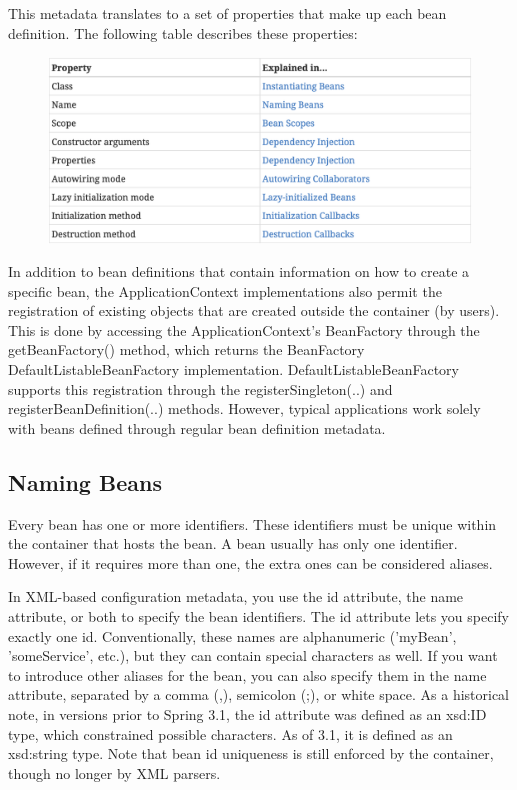 This metadata translates to a set of properties that make up each bean definition. The following
table describes these properties:


\begin{figure}[ht]
    \centering
    \includegraphics[width=1\linewidth]{./Figure/IMG_bean_def.png}
\end{figure}

In addition to bean definitions that contain information on how to create a specific bean, the
ApplicationContext implementations also permit the registration of existing objects that are created
outside the container (by users). This is done by accessing the ApplicationContext’s BeanFactory
through the getBeanFactory() method, which returns the BeanFactory DefaultListableBeanFactory
implementation. DefaultListableBeanFactory supports this registration through the
registerSingleton(..) and registerBeanDefinition(..) methods. However, typical applications
work solely with beans defined through regular bean definition metadata.


\subsection{Naming Beans}

Every bean has one or more identifiers. These identifiers must be unique within the container that
hosts the bean. A bean usually has only one identifier. However, if it requires more than one, the
extra ones can be considered aliases.

In XML-based configuration metadata, you use the id attribute, the name attribute, or both to specify
the bean identifiers. The id attribute lets you specify exactly one id. Conventionally, these names
are alphanumeric ('myBean', 'someService', etc.), but they can contain special characters as well. If
you want to introduce other aliases for the bean, you can also specify them in the name attribute,
separated by a comma (,), semicolon (;), or white space. As a historical note, in versions prior to
Spring 3.1, the id attribute was defined as an xsd:ID type, which constrained possible characters. As
of 3.1, it is defined as an xsd:string type. Note that bean id uniqueness is still enforced by the
container, though no longer by XML parsers.


